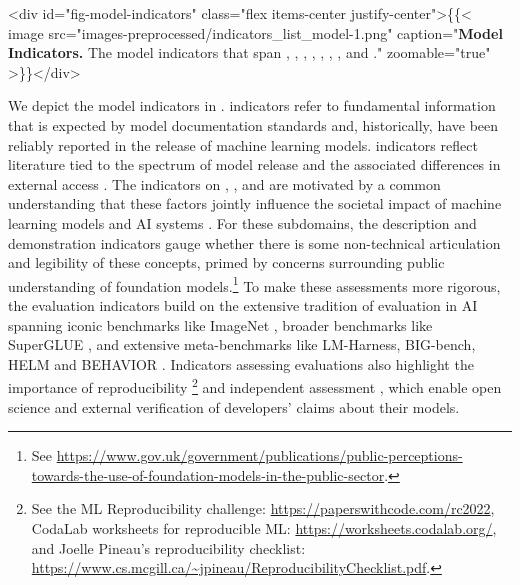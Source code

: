 \documentclass[screen, authorversion, acmsmall]{acmart}
\begin{document}
<div id="fig-model-indicators" class="flex items-center justify-center">\{\{< image src="images-preprocessed/indicators_list_model-1.png" caption="\textbf{Model Indicators.}  The \nummodelindicators model indicators that span \modelbasics, \modelaccess, \capabilities, \limitations, \risks, \modelmitigations, \trustworthiness, and \inference." zoomable="true" >\}\}</div>



\noindent 
We depict the model indicators in .
\modelbasics indicators refer to fundamental information that is expected by model documentation standards \citep{mitchell2019model, crisan2022interactive, bommasani2023ecosystem} and, historically, have been reliably reported in the release of machine learning models. 
\modelaccess indicators reflect literature tied to the spectrum of model release and the associated differences in external access \citep{solaiman2019release, sastry2021release, shevlane2022structured, liang2022norms, solaiman2023gradient}. 
The indicators on \capabilities, \limitations, \risks and \modelmitigations are motivated by a common understanding that these factors jointly influence the societal impact of machine learning models and AI systems \citep{tabassi2023airmf, weidinger2023sociotechnical}. 
For these subdomains, the description and demonstration indicators gauge whether there is some non-technical articulation and legibility of these concepts, primed by concerns surrounding public understanding of foundation models.\footnote{See \url{https://www.gov.uk/government/publications/public-perceptions-towards-the-use-of-foundation-models-in-the-public-sector}.} 
To make these assessments more rigorous, the evaluation indicators build on the extensive tradition of evaluation in AI spanning iconic benchmarks like ImageNet \citep{deng2009imagenet}, broader benchmarks like SuperGLUE \cite{wang2019superglue}, and extensive meta-benchmarks like LM-Harness, BIG-bench, HELM and BEHAVIOR \citep{gao2021harness, srivastava2022bigbench, liang2023holistic, srivastava2021behavior}. 
Indicators assessing evaluations also highlight the importance of reproducibility \citep{lipton2019troubling, kapoor2023reforms, kapoor2023leakage}\footnote{See the ML Reproducibility challenge: \url{https://paperswithcode.com/rc2022}, CodaLab worksheets for reproducible ML: \url{https://worksheets.codalab.org/}, and Joelle Pineau's reproducibility checklist: \url{https://www.cs.mcgill.ca/~jpineau/ReproducibilityChecklist.pdf}.} and independent assessment \citep{sandvig2014auditing, raji2019actionable, metaxa2021audit, costanzachock2022audit, raji2022audit, raji2022mozilla, lam2022user, weidinger2023sociotechnical}, which enable open science and external verification of developers' claims about their models.
\end{document}
